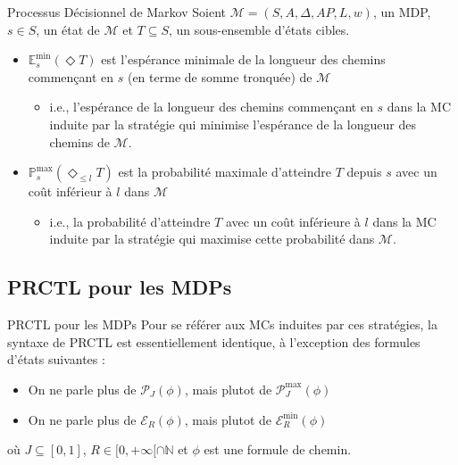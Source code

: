 \documentclass[compress]{beamer}
\begin{document}
\begin{frame}{Processus Décisionnel de Markov}
    Soient $\mathcal{M} = (S, A, \Delta, AP, L, w)$, un MDP, $s \in S$, un état
    de $\mathcal{M}$ et $T \subseteq S$, un sous-ensemble d'états cibles.
\begin{itemize}
  \item {\color{fibeamer@blue}$\mathbb{E}_s^{\min}(\Diamond T)$ est l'espérance minimale de la longueur des chemins commençant en $s$ (en terme de somme tronquée) de $\mathcal{M}$}
  \begin{itemize}
    \item i.e., l'espérance de la longueur des chemins commençant en $s$ dans la MC induite par la {\color{fibeamer@orange}stratégie qui minimise l'espérance de la longueur des chemins de $\mathcal{M}$}.
  \end{itemize}
  \item {\color{fibeamer@blue}$\mathbb{P}_s^{\max}(\Diamond_{\leq l} T)$ est la probabilité maximale d'atteindre $T$ depuis $s$ avec un coût inférieur à $l$ dans $\mathcal{M}$}
  \begin{itemize}
    \item i.e., la probabilité d'atteindre $T$ avec un coût inférieure à $l$ dans la MC induite par la {\color{fibeamer@orange}stratégie qui maximise cette probabilité dans $\mathcal{M}$}.
  \end{itemize}
\end{itemize}
\end{frame}

\subsection{PRCTL pour les MDPs}
\begin{frame}{PRCTL pour les MDPs}
  Pour se référer aux MCs induites par ces stratégies, la syntaxe de PRCTL est essentiellement identique, à l'exception des formules d'états suivantes :
  \begin{itemize}
    \item On ne parle plus de $\mathcal{P}_J(\phi)$, mais plutot de $\mathcal{P}_J^{\max}(\phi)$
    \item On ne parle plus de $\mathcal{E}_R(\phi)$, mais plutot de $\mathcal{E}_R^{\min}(\phi)$
  \end{itemize}
    où $J \subseteq [0, 1]$, $R \in [0, +\infty[ \cap \mathbb{N}$ et $\phi$ est une formule de chemin.
\end{frame}
\end{document}
